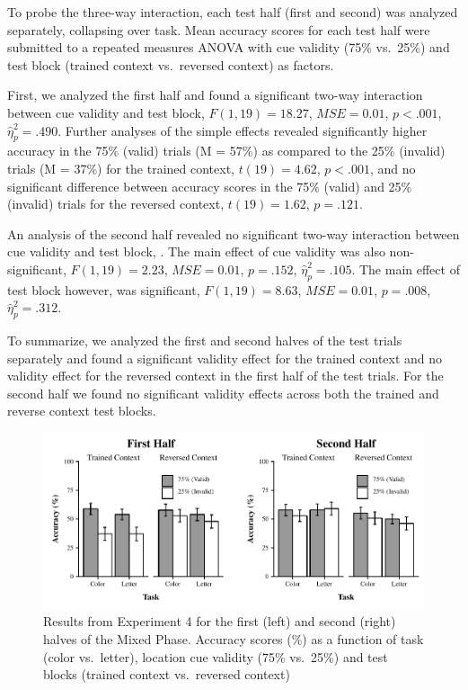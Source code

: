 \documentclass[english,,man,floatsintext]{apa6}
\begin{document}
To probe the three-way interaction, each test half (first and second)
was analyzed separately, collapsing over task. Mean accuracy scores for
each test half were submitted to a repeated measures ANOVA with cue
validity (75\% vs.~25\%) and test block (trained context vs.~reversed
context) as factors.

First, we analyzed the first half and found a significant two-way
interaction between cue validity and test block, \(F(1, 19) = 18.27\),
\(\mathit{MSE} = 0.01\), \(p < .001\), \(\hat{\eta}^2_p = .490\).
Further analyses of the simple effects revealed significantly higher
accuracy in the 75\% (valid) trials (M = 57\%) as compared to the 25\%
(invalid) trials (M = 37\%) for the trained context, \(t(19) = 4.62\),
\(p < .001\), and no significant difference between accuracy scores in
the 75\% (valid) and 25\% (invalid) trials for the reversed context,
\(t(19) = 1.62\), \(p = .121\).

An analysis of the second half revealed no significant two-way
interaction between cue validity and test block, . The main effect of
cue validity was also non-significant, \(F(1, 19) = 2.23\),
\(\mathit{MSE} = 0.01\), \(p = .152\), \(\hat{\eta}^2_p = .105\). The
main effect of test block however, was significant, \(F(1, 19) = 8.63\),
\(\mathit{MSE} = 0.01\), \(p = .008\), \(\hat{\eta}^2_p = .312\).

To summarize, we analyzed the first and second halves of the test trials
separately and found a significant validity effect for the trained
context and no validity effect for the reversed context in the first
half of the test trials. For the second half we found no significant
validity effects across both the trained and reverse context test
blocks.

\begin{figure}
\centering
\includegraphics{figures/IC-figure6.pdf}
\caption{\label{fig:figure6}Results from Experiment 4 for the first (left) and second
(right) halves of the Mixed Phase. Accuracy scores (\%) as a function of
task (color vs.~letter), location cue validity (75\% vs.~25\%) and test
blocks (trained context vs.~reversed context)}
\end{figure}
\end{document}
